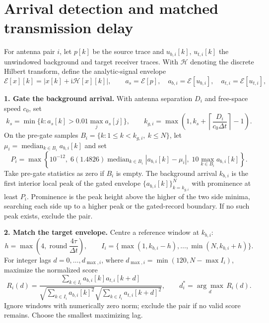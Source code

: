 \documentclass[11pt]{article}
\begin{document}
\newpage
\section*{Arrival detection and matched transmission delay}
For antenna pair $i$, let $p[k]$ be the source trace and $u_{b,i}[k]$, $u_{t,i}[k]$ the unwindowed background and target receiver traces. With $\mathcal H$ denoting the discrete Hilbert transform, define the analytic-signal envelope
\begin{equation}
 \mathcal E[x][k]=\left|x[k]+\mathrm{i}\mathcal H[x][k]\right|,\qquad
 a_s=\mathcal E[p],\quad a_{b,i}=\mathcal E[u_{b,i}],\quad a_{t,i}=\mathcal E[u_{t,i}],
\end{equation}

\textbf{1. Gate the background arrival.} With antenna separation $D_i$ and free-space speed $c_0$, set
\begin{equation}
 k_s=\min\{k:a_s[k]>0.01\max_j a_s[j]\},\qquad
 k_{g,i}=\max\!\left(1,k_s+\left\lceil\frac{D_i}{c_0\Delta t}\right\rceil-1\right).
\end{equation}
On the pre-gate samples $B_i=\{k:1\leq k<k_{g,i},\ k\leq N\}$, let $\mu_i=\operatorname{median}_{k\in B_i}a_{b,i}[k]$ and set
\begin{equation}
 P_i=\max\!\left\{10^{-12},\;6(1.4826)\operatorname{median}_{k\in B_i}|a_{b,i}[k]-\mu_i|,\;10\max_{k\in B_i}a_{b,i}[k]\right\}.
\end{equation}
Take pre-gate statistics as zero if $B_i$ is empty. The background arrival $k_{b,i}$ is the first interior local peak of the gated envelope $\{a_{b,i}[k]\}_{k=k_{g,i}}^N$ with prominence at least $P_i$. Prominence is the peak height above the higher of the two side minima, searching each side up to a higher peak or the gated-record boundary. If no such peak exists, exclude the pair.

\textbf{2. Match the target envelope.} Centre a reference window at $k_{b,i}$:
\begin{equation}
 h=\max\!\left(4,\operatorname{round}\frac{4\tau}{\Delta t}\right),\qquad
 I_i=\{\max(1,k_{b,i}-h),\ldots,\min(N,k_{b,i}+h)\}.
\end{equation}
For integer lags $d=0,\ldots,d_{\max,i}$, where $d_{\max,i}=\min(120,N-\max I_i)$, maximize the normalized score
\begin{equation}
 R_i(d)=\frac{\sum_{k\in I_i}a_{b,i}[k]a_{t,i}[k+d]}
 {\sqrt{\sum_{k\in I_i}a_{b,i}[k]^2}\sqrt{\sum_{k\in I_i}a_{t,i}[k+d]^2}},\qquad
 d_i^*=\underset{d}{\arg\max}\,R_i(d).
\end{equation}
Ignore windows with numerically zero norm; exclude the pair if no valid score remains. Choose the smallest maximizing lag.
\end{document}

